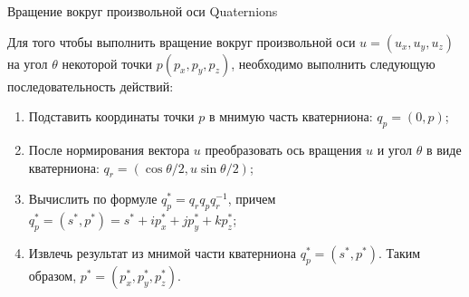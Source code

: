 \documentclass{beamer}
\begin{document}
	\begin{frame}{Вращение вокруг произвольной оси} {Quaternions}
		
		Для того чтобы выполнить вращение вокруг произвольной оси $u=(u_x,u_y,u_z)$ на угол $\theta$ некоторой точки $p(p_x,p_y,p_z)$, необходимо выполнить следующую последовательность действий:

		\begin{enumerate}
			\item Подставить координаты точки $p$ 
			в мнимую часть кватерниона:
			$q_p = (0,p)$;
			
			\item После нормирования вектора $u$ преобразовать ось вращения $u$ и угол $\theta$ в виде кватерниона:
			$q_r = (\cos \theta / 2, u \sin \theta / 2)$;
			
			\item Вычислить по формуле $q_p^{*}=q_r q_p q_r^{-1}$, причем 
			$q_p^{*} = (s^{*},p^{*}) = s^*+i p_x^*+jp_y^*+kp_z^*$; 
			
			\item Извлечь результат из мнимой части кватерниона $q_p^{*} = (s^{*},p^{*})$.
			Таким образом,
			 $p^* = (p_x^*, p_y^*, p_z^*)$.
		\end{enumerate}
		
	\end{frame}
\end{document}
